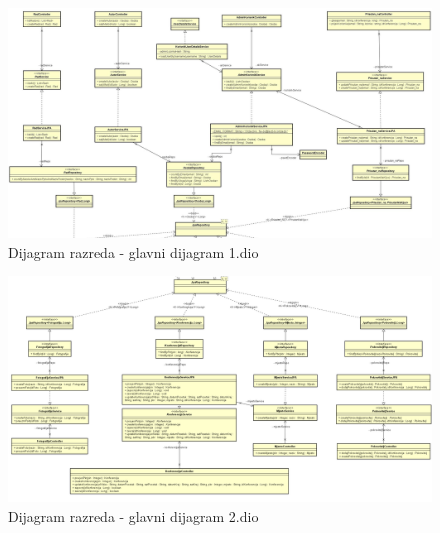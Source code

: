 			\begin{figure}[H]
				\includegraphics[scale=0.23]{dijagrami/glavni_1.JPG}%
				\centering
				\caption{Dijagram razreda - glavni dijagram 1.dio}
				\label{fig:promjena9.1}
			\end{figure}
			
			\begin{figure}[H]
				\includegraphics[scale=0.4]{dijagrami/glavni_2.png}%
				\centering
				\caption{Dijagram razreda - glavni dijagram 2.dio}
				\label{fig:promjena9.2}
			\end{figure}
			
